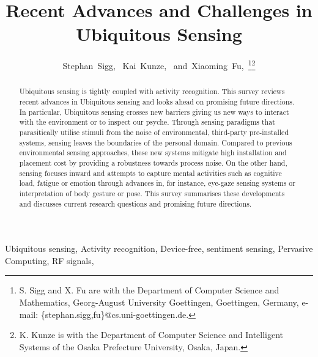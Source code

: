\documentclass[journal]{IEEEtran}
\begin{document}
\title{Recent Advances and Challenges in Ubiquitous Sensing}


\author{Stephan~Sigg,~
        Kai~Kunze,~
        and~Xiaoming~Fu,~\thanks{S. Sigg and X. Fu are with the Department of Computer Science and Mathematics, Georg-August University Goettingen, Goettingen, Germany,
e-mail: \{stephan.sigg,fu\}@cs.uni-goettingen.de.}\thanks{K. Kunze is with the Department of Computer Science and Intelligent Systems of the Osaka Prefecture University, Osaka, Japan.}}



















\maketitle

\begin{abstract}
Ubiquitous sensing is tightly coupled with activity recognition.
This survey reviews recent advances in Ubiquitous sensing and looks ahead on promising future directions. 
In particular, Ubiquitous sensing crosses new barriers giving us new ways to interact with the environment or to inspect our psyche.
Through sensing paradigms that parasitically utilise stimuli from the noise of environmental, third-party pre-installed systems, sensing leaves the boundaries of the personal domain.
Compared to previous environmental sensing approaches, these new systems mitigate high installation and placement cost by providing a robustness towards process noise.
On the other hand, sensing focuses inward and attempts to capture mental activities such as cognitive load, fatigue or emotion through advances in, for instance, eye-gaze sensing systems or interpretation of body gesture or pose.
This survey summarises these developments and discusses current research questions and promising future directions.
\end{abstract}

\begin{IEEEkeywords}
Ubiquitous sensing, Activity recognition, Device-free, sentiment sensing, Pervasive Computing, RF signals, 
\end{IEEEkeywords}
\end{document}
